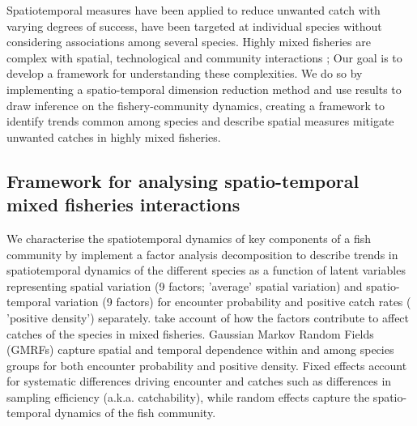 \documentclass{nature}
\begin{document}
Spatiotemporal  measures  have been applied to reduce unwanted catch with
varying degrees of success\cite{Needle2011, Dunn2014a}, 
  have  been
targeted at individual species without considering associations  among several species. Highly mixed fisheries are complex
with spatial, technological and community interactions ;
  Our goal is to develop a
framework for understanding these complexities. We do so by implementing a
spatio-temporal dimension reduction method and use  results to
draw inference on the fishery-community dynamics, creating a framework to
identify trends common among species  and describe
 spatial
measures  mitigate
unwanted catches in highly mixed fisheries.


\subsection{Framework for analysing spatio-temporal mixed fisheries
	interactions}

 We 
characterise the spatiotemporal dynamics of key components of a fish community
by  implement a factor analysis decomposition
to describe trends in spatiotemporal dynamics of the different species as a
function of latent variables \cite{Thorson2015} representing spatial variation
(9 factors;  'average' spatial variation) and
spatio-temporal variation (9 factors) for encounter probability and positive
catch rates ( 'positive density')
separately\cite{Thorson2015a}.   take account of how the factors contribute to affect
catches of the species in mixed fisheries.  Gaussian Markov
Random Fields (GMRFs)  capture spatial and temporal dependence
within and among species groups for both encounter probability and positive
density\cite{Thorson2013}.  Fixed effects  account for
systematic differences driving encounter and catches\deleted{,} such as
differences in sampling efficiency (a.k.a.  catchability), while random effects
capture the spatio-temporal dynamics of the fish community.
\end{document}
